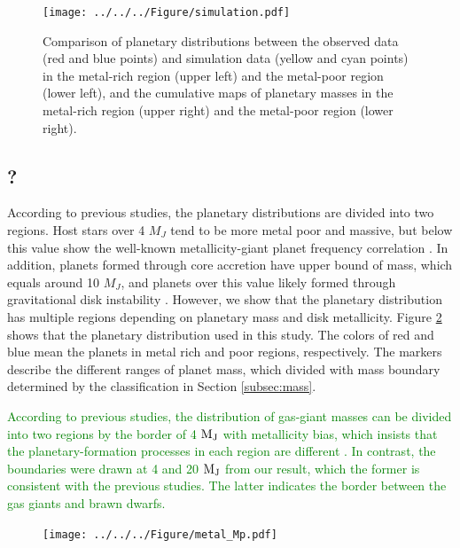 \documentclass[twocolumn, dvipdfmx]{aastex62}
\begin{document}
\begin{CJK*}{UTF8}{min}
\begin{figure}[t]
\begin{center}
\texttt{[image: ../../../Figure/simulation.pdf]}
\caption{Comparison of planetary distributions between the observed data (red and blue points) and simulation data (yellow and cyan points) in the metal-rich region (upper left) and the metal-poor region (lower left), and the cumulative maps of planetary masses in the metal-rich region (upper right) and the metal-poor region (lower right). \label{fig:simulation}}
\end{center}
\end{figure}


\subsection{?}

According to previous studies, the planetary distributions are divided into two regions. Host stars over 4 $M_J$ tend to be more metal poor and massive, but below this value show the well-known metallicity-giant planet frequency correlation \citep{2017A&A...603A..30S}. In addition, planets formed through core accretion have upper bound of mass, which equals around 10 $M_J$, and planets over this value likely formed through gravitational disk instability \citep{2018ApJ...853...37S}.  However, we show that the planetary distribution has multiple regions depending on planetary mass and disk metallicity. Figure \ref{fig:metal_Mp} shows that the planetary distribution used in this study. The colors of red and blue mean the planets in metal rich and poor regions, respectively. The markers describe the different ranges of planet mass, which divided with mass boundary determined by the classification in Section \ref{subsec:mass}. 

\textcolor{green}{According to previous studies, the distribution of gas-giant masses can be divided into two regions by the border of 4 $\rm M_J$ with metallicity bias, which insists that the planetary-formation processes in each region are different \citep[e.g.,][]{2017A&A...603A..30S}. In contrast, the boundaries were drawn at 4 and 20 $\rm M_J$ from our result, which the former is consistent with the previous studies. The latter indicates the border between the gas giants and brawn dwarfs.}

\begin{figure}[t]
\begin{center}
\texttt{[image: ../../../Figure/metal\_Mp.pdf]}
\caption{\label{fig:metal_Mp}}
\end{center}
\end{figure}



\end{CJK*}
\end{document}
